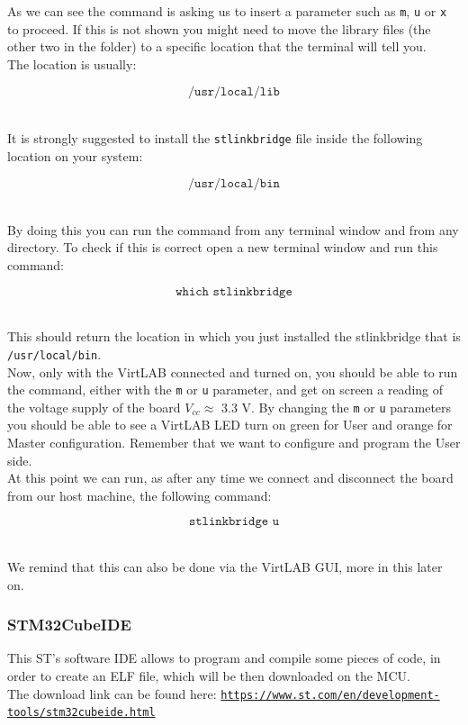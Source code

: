 \documentclass[../main.tex]{subfiles}
\begin{document}
As we can see the command is asking us to insert a parameter such as \texttt{m}, \texttt{u} or \texttt{x} to proceed.
If this is not shown you might need to move the library files (the other two in the folder) to a specific location that the terminal will tell you. \\

The location is usually:

\[ \texttt{/usr/local/lib} \]\

It is strongly suggested to install the \texttt{stlinkbridge} file inside the following location on your system:

\[ \texttt{/usr/local/bin} \]\

By doing this you can run the command from any terminal window and from any directory. To check if this is correct open a new terminal window and run this command:

\[ \texttt{which stlinkbridge} \]\

This should return the location in which you just installed the stlinkbridge that is \texttt{/usr/local/bin}.\\

Now, only with the VirtLAB connected and turned on, you should be able to run the command, either with the \texttt{m} or \texttt{u} parameter, and get on screen a reading of the voltage supply of the board $V_{cc} \approx$ 3.3 V.
By changing the \texttt{m} or \texttt{u} parameters you should be able to see a VirtLAB LED turn on green for User and orange for Master configuration. Remember that we want to configure and program the User side.\\

At this point we can run, as after any time we connect and disconnect the board from our host machine, the following command:

\[ \texttt{stlinkbridge u} \]\

We remind that this can also be done via the VirtLAB GUI, more in this later on.



\subsubsection*{STM32CubeIDE}


This ST’s software IDE allows to program and compile some pieces of code, in order to create an ELF file, which will be then downloaded on the MCU.\\

The download link can be found here: \href{https://www.st.com/en/development-tools/stm32cubeide.html}{\texttt{https://www.st.com/en/development-tools/stm32cubeide.html}}
\end{document}
